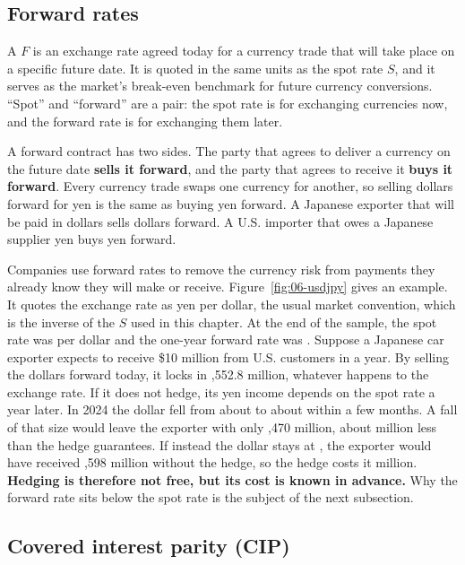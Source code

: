 \subsection{Forward rates}

A  $F$ is an exchange rate agreed today for a currency trade that will take place on a specific future date. It is quoted in the same units as the spot rate $S$, and it serves as the market's break-even benchmark for future currency conversions.
“Spot” and “forward” are a pair: the spot rate is for exchanging currencies now, and the forward rate is for exchanging them later.

A forward contract has two sides. The party that agrees to deliver a currency on the future date \textbf{sells it forward}, and the party that agrees to receive it \textbf{buys it forward}. Every currency trade swaps one currency for another, so selling dollars forward for yen is the same as buying yen forward. A Japanese exporter that will be paid in dollars sells dollars forward. A U.S. importer that owes a Japanese supplier yen buys yen forward.

Companies use forward rates to remove the currency risk from payments they already know they will make or receive. Figure~\ref{fig:06-usdjpy} gives an example. It quotes the exchange rate as yen per dollar, the usual market convention, which is the inverse of the $S$ used in this chapter. At the end of the sample, the spot rate was  per dollar and the one-year forward rate was . Suppose a Japanese car exporter expects to receive \$10 million from U.S. customers in a year. By selling the dollars forward today, it locks in ,552.8 million, whatever happens to the exchange rate. If it does not hedge, its yen income depends on the spot rate a year later. In 2024 the dollar fell from about  to about  within a few months. A fall of that size would leave the exporter with only ,470 million, about  million less than the hedge guarantees. If instead the dollar stays at , the exporter would have received ,598 million without the hedge, so the hedge costs it  million. \textbf{Hedging is therefore not free, but its cost is known in advance.} Why the forward rate sits below the spot rate is the subject of the next subsection.


\subsection{Covered interest parity (CIP)}


